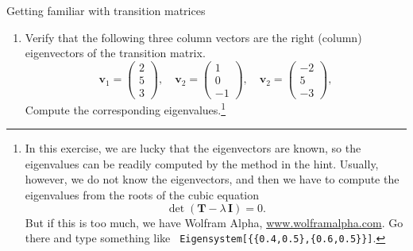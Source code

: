 \documentclass[12pt]{article}
\begin{document}
\begin{problem}{Getting familiar with transition matrices}
\begin{enumerate}
  \begin{figure}[h]
    \centering
  \end{figure}

  \item
  \label{prob1:eigenv}
  Verify that the following three column vectors
  are the right (column) eigenvectors
  of the transition matrix.
  $$
  \mathbf v_1
  =
  \left(
    \begin{array}{r}
      2 \\
      5 \\
      3
    \end{array}
  \right),
  \quad
  \mathbf v_2
  =
  \left(
    \begin{array}{r}
      1 \\
      0 \\
      -1
    \end{array}
  \right),
  \quad
  \mathbf v_2
  =
  \left(
    \begin{array}{r}
      -2 \\
       5 \\
      -3
    \end{array}
  \right),
  $$
  Compute the corresponding eigenvalues.\footnote{
    In this exercise, we are lucky that
    the eigenvectors are known,
    so the eigenvalues can be readily computed
    by the method in the hint.
    Usually, however, we do not know the eigenvectors,
    and then we have to compute the eigenvalues from
    the roots of the cubic equation
    $$
    \det (\mathbf T - \lambda \, \mathbf I) = 0.
    $$
    But if this is too much,
    we have Wolfram Alpha, \url{www.wolframalpha.com}.
    Go there and type something like
    \texttt{
      Eigensystem[\{\{0.4,0.5\},\{0.6,0.5\}\}]}.
  }



\end{enumerate}
\end{problem}
\end{document}
